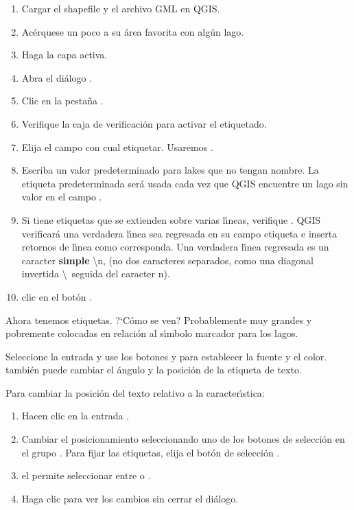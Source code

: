 \begin{enumerate}
\item Cargar el shapefile  y el archivo GML  en QGIS.
\item Ac\'erquese un poco a su \'area favorita con alg\'un lago.
\item Haga  la capa activa.
\item Abra el di\'alogo .
\item Clic en la pesta\~na .
\item Verifique la caja de verificaci\'on  para activar el etiquetado.
\item Elija el campo con cual etiquetar. 
  Usaremos .
\item Escriba un valor predeterminado para lakes que no tengan nombre. La etiqueta predeterminada ser\'a
  usada cada vez que QGIS encuentre un lago sin valor en el campo .
\item Si tiene etiquetas que se extienden sobre varias l\'{\i}neas, verifique . 
QGIS verificar\'a una verdadera l\'{\i}nea sea regresada en su campo etiqueta e inserta retornos de l\'{\i}nea como corresponda.
Una verdadera l\'{\i}nea regresada es un caracter \textbf{simple} \textbackslash n, 
(no dos caracteres separados, como una diagonal invertida \textbackslash ~seguida del caracter n).
\item clic en el bot\'on .
\end{enumerate} 

Ahora tenemos etiquetas. ?`C\'omo se ven? Probablemente muy grandes y pobremente colocadas en relaci\'on al s\'{\i}mbolo
marcador para los lagos.

Seleccione la entrada  y use los botones   y 
para establecer la fuente y el color. también puede cambiar el \'angulo y la posici\'on de la etiqueta de texto.


Para cambiar la posici\'on del texto relativo a la caracter\'{\i}stica:

\begin{enumerate} 
\item Hacen clic en la entrada .
\item Cambiar el posicionamiento seleccionando uno de los botones de selecci\'on
en el grupo . Para fijar las etiquetas, elija el bot\'on de selecci\'on
.
\item el  permite seleccionar entre
 o .
\item Haga clic  para ver los cambios sin cerrar el di\'alogo.
\end{enumerate} 

